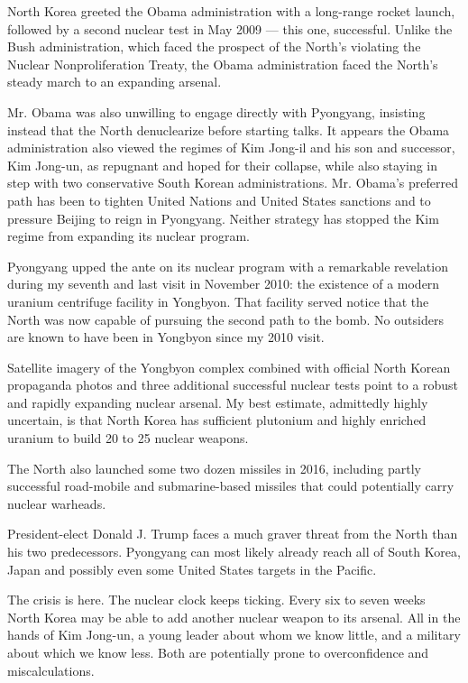 North Korea greeted the Obama administration with a long-range rocket
launch, followed by a second nuclear test in May 2009 --- this one,
successful. Unlike the Bush administration, which faced the prospect of
the North's violating the Nuclear Nonproliferation Treaty, the Obama
administration faced the North's steady march to an expanding arsenal.

Mr. Obama was also unwilling to engage directly with Pyongyang,
insisting instead that the North denuclearize before starting talks. It
appears the Obama administration also viewed the regimes of Kim Jong-il
and his son and successor, Kim Jong-un, as repugnant and hoped for their
collapse, while also staying in step with two conservative South Korean
administrations. Mr. Obama's preferred path has been to tighten United
Nations and United States sanctions and to pressure Beijing to reign in
Pyongyang. Neither strategy has stopped the Kim regime from expanding
its nuclear program.

Pyongyang upped the ante on its nuclear program with a remarkable
revelation during my seventh and last visit in November 2010: the
existence of a modern uranium centrifuge facility in Yongbyon. That
facility served notice that the North was now capable of pursuing the
second path to the bomb. No outsiders are known to have been in Yongbyon
since my 2010 visit.

Satellite imagery of the Yongbyon complex combined with official North
Korean propaganda photos and three additional successful nuclear tests
point to a robust and rapidly expanding nuclear arsenal. My best
estimate, admittedly highly uncertain, is that North Korea has
sufficient plutonium and highly enriched uranium to build 20 to 25
nuclear weapons.

The North also launched some two dozen missiles in 2016, including
partly successful road-mobile and submarine-based missiles that could
potentially carry nuclear warheads.

President-elect Donald J. Trump faces a much graver threat from the
North than his two predecessors. Pyongyang can most likely already reach
all of South Korea, Japan and possibly even some United States targets
in the Pacific.

The crisis is here. The nuclear clock keeps ticking. Every six to seven
weeks North Korea may be able to add another nuclear weapon to its
arsenal. All in the hands of Kim Jong-un, a young leader about whom we
know little, and a military about which we know less. Both are
potentially prone to overconfidence and miscalculations.

